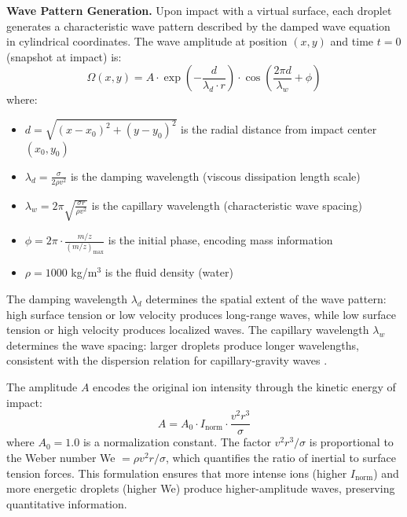 \documentclass[11pt,twocolumn]{article}
\begin{document}
\textbf{Wave Pattern Generation.} Upon impact with a virtual surface, each droplet generates a characteristic wave pattern described by the damped wave equation in cylindrical coordinates. The wave amplitude at position $(x, y)$ and time $t = 0$ (snapshot at impact) is:
\begin{equation}
    \Omega(x, y) = A \cdot \exp\left(-\frac{d}{\lambda_d \cdot r}\right) \cdot \cos\left(\frac{2\pi d}{\lambda_w} + \phi\right)
    \label{eq:wave_pattern}
\end{equation}
where:
\begin{itemize}[leftmargin=*]
    \item $d = \sqrt{(x - x_0)^2 + (y - y_0)^2}$ is the radial distance from impact center $(x_0, y_0)$
    \item $\lambda_d = \frac{\sigma}{2\rho v^2}$ is the damping wavelength (viscous dissipation length scale)
    \item $\lambda_w = 2\pi\sqrt{\frac{\sigma r}{\rho v^2}}$ is the capillary wavelength (characteristic wave spacing)
    \item $\phi = 2\pi \cdot \frac{m/z}{(m/z)_{\max}}$ is the initial phase, encoding mass information
    \item $\rho = 1000$ kg/m$^3$ is the fluid density (water)
\end{itemize}

The damping wavelength $\lambda_d$ determines the spatial extent of the wave pattern: high surface tension or low velocity produces long-range waves, while low surface tension or high velocity produces localized waves. The capillary wavelength $\lambda_w$ determines the wave spacing: larger droplets produce longer wavelengths, consistent with the dispersion relation for capillary-gravity waves \cite{lamb1932hydrodynamics}.

The amplitude $A$ encodes the original ion intensity through the kinetic energy of impact:
\begin{equation}
    A = A_0 \cdot I_{\text{norm}} \cdot \frac{v^2 r^3}{\sigma}
    \label{eq:amplitude}
\end{equation}
where $A_0 = 1.0$ is a normalization constant. The factor $v^2 r^3 / \sigma$ is proportional to the Weber number We $= \rho v^2 r / \sigma$, which quantifies the ratio of inertial to surface tension forces. This formulation ensures that more intense ions (higher $I_{\text{norm}}$) and more energetic droplets (higher We) produce higher-amplitude waves, preserving quantitative information.
\end{document}
